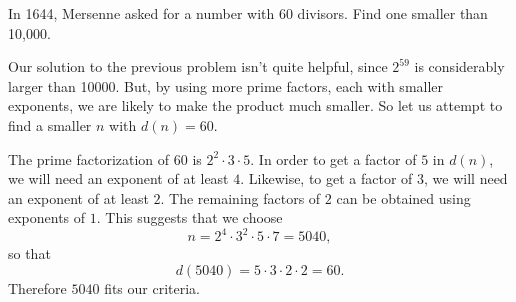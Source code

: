  In 1644, Mersenne asked for a number with $60$
divisors. Find one smaller than 10,000.
\begin{solution}
  Our solution to the previous problem isn't quite helpful, since
  $2^{59}$ is considerably larger than 10000. But, by using more prime
  factors, each with smaller exponents, we are likely to make the
  product much smaller. So let us attempt to find a smaller $n$ with
  $d(n) = 60$.

  The prime factorization of $60$ is $2^2\cdot3\cdot5$. In order to
  get a factor of $5$ in $d(n)$, we will need an exponent of at least
  $4$. Likewise, to get a factor of $3$, we will need an exponent of
  at least $2$. The remaining factors of $2$ can be obtained using
  exponents of $1$. This suggests that we choose
  \begin{equation*}
    n = 2^4\cdot3^2\cdot5\cdot7 = 5040,
  \end{equation*}
  so that
  \begin{equation*}
    d(5040) = 5\cdot3\cdot2\cdot2 = 60.
  \end{equation*}
  Therefore $5040$ fits our criteria.
\end{solution}
